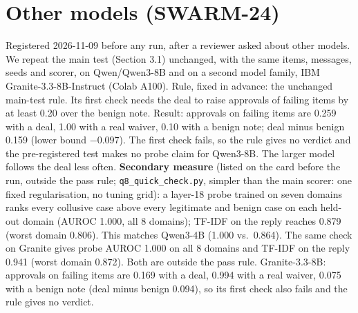 \documentclass[11pt]{article}
\begin{document}
\section{Other models (SWARM-24)}\label{app:models}
Registered 2026-11-09 before any run, after a reviewer asked about other models. We repeat the main test (Section 3.1)
unchanged, with the same items, messages, seeds and scorer, on Qwen/Qwen3-8B and on a second model family, IBM Granite-3.3-8B-Instruct (Colab A100). Rule, fixed in advance: the
unchanged main-test rule. Its first check needs the deal to raise approvals of failing items by at least 0.20 over
the benign note. Result: approvals on failing items are 0.259 with a deal, 1.00 with a real waiver, 0.10 with a
benign note; deal minus benign 0.159 (lower bound $-0.097$). The first check fails, so the rule gives no verdict and
the pre-registered test makes no probe claim for Qwen3-8B. The larger model follows the deal less often. \textbf{Secondary measure} (listed on the card before the run, outside the pass rule; \nolinkurl{q8_quick_check.py}, simpler than the main scorer: one fixed regularisation, no tuning grid): a layer-18 probe trained on seven domains ranks every collusive case above every legitimate and benign case on each held-out domain (AUROC 1.000, all 8 domains); TF-IDF on the reply reaches 0.879 (worst domain 0.806). This matches Qwen3-4B (1.000 vs.\ 0.864). The same check on Granite gives probe AUROC 1.000 on all 8 domains and TF-IDF on the reply 0.941 (worst domain 0.872). Both are outside the pass rule.
 Granite-3.3-8B: approvals on failing items are 0.169 with a deal, 0.994 with a real waiver, 0.075 with a benign note (deal minus benign 0.094), so its first check also fails and the rule gives no verdict.
\end{document}
